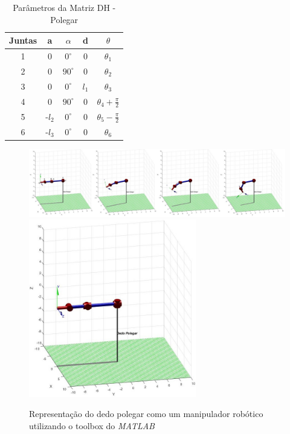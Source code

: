 \begin{table}[H]
\centering
\caption{Parâmetros da Matriz DH - Polegar}
\label{DHPolegar}
\begin{tabular}{|c|c|c|c|c|}
	\hline
    Juntas & a & $\alpha$ & d & $\theta$ \\ \hline
    1 & 0 & $0^\circ$ & 0 & $\theta_1$ \\ \hline
    2 & 0 & $90^\circ$ & 0 & $\theta_2$ \\ \hline
    3 & 0 & $0^\circ$ & $l_1$ & $\theta_3$ \\ \hline
    4 & 0 & $90^\circ$ & 0 & $\theta_4 + \frac{\pi}{2}$  \\ \hline
    5 & -$l_2$ & $0^\circ$ & 0 & $\theta_5 - \frac{\pi}{2}$ \\ \hline
    6 & -$l_3$ & $0^\circ$ & 0 & $\theta_6$ \\
	\hline
\end{tabular}
\end{table}

\begin{figure}[H]
\centering
\includegraphics[width = 1\textwidth]{img/Polegar.JPG}
\includegraphics[width = 0.65\textwidth]{img/Polegar1.JPG}
\caption[Representação do dedo polegar como um manipulador robótico]{Representação do dedo polegar como um manipulador robótico utilizando o toolbox do \textit{MATLAB} \cite{corke1996robotics}}
\label{JuntasPolegar}
\end{figure}

